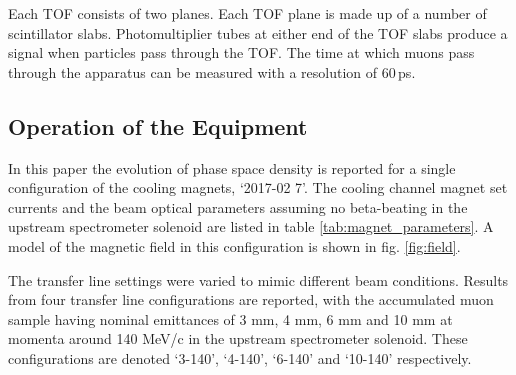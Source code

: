 Each TOF consists of two planes. Each TOF plane is made up of a number of 
scintillator slabs. Photomultiplier tubes at either end of the TOF slabs produce 
a signal when particles pass through the TOF. The time at which muons pass 
through the apparatus can be measured with a resolution of 60\,ps.

\subsection{Operation of the Equipment}
In this paper the evolution of phase space density is reported for a single 
configuration of the cooling magnets,  `2017-02 7'. The 
cooling channel magnet set currents and the beam optical parameters assuming no
beta-beating in the upstream spectrometer solenoid are listed in table 
\ref{tab:magnet_parameters}. A  model of the magnetic field in this 
configuration is shown in fig. \ref{fig:field}.

The transfer line settings were varied 
to mimic different beam conditions. Results from four transfer line 
configurations are reported, with the accumulated muon sample having nominal 
emittances of 3 mm, 4 mm, 6 mm  and 10 mm at momenta around 140 MeV/c in the 
upstream spectrometer solenoid. These configurations are denoted 
`3-140', `4-140', `6-140' and `10-140' respectively.

